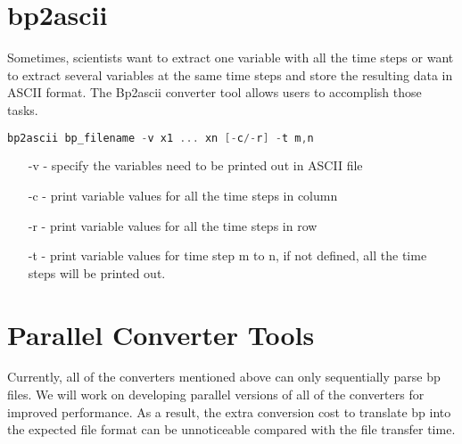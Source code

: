 \section{bp2ascii}

Sometimes, scientists want to extract one variable with all the time steps or want 
to extract several variables at the same time steps and store the resulting data 
in ASCII format. The Bp2ascii converter tool allows users to accomplish those tasks. 

\begin{lstlisting}[language=C,caption={},label={}]
bp2ascii bp_filename -v x1 ... xn [-c/-r] -t m,n
\end{lstlisting}

\begin{itemize}
\item[-v] - specify the variables need to be printed out in ASCII file

\item[-c] - print variable values for all the time steps in column

\item[-r] - print variable values for all the time steps in row

\item[-t] - print variable values for time step m to n,  if not defined, all the time 
steps will be printed out.
\end{itemize}



\section{Parallel Converter Tools}

Currently, all of the converters mentioned above can only sequentially parse bp 
files. We will work on developing parallel versions of all of the converters for 
improved performance. As a result, the extra conversion cost to translate bp into 
the expected file format can be unnoticeable compared with the file transfer time. 

